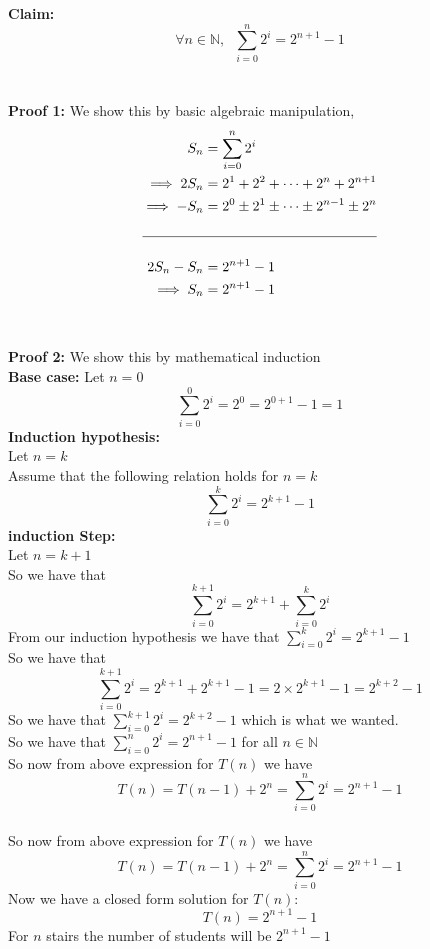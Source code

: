 \documentclass[addpoints]{exam}
\begin{document}
\begin{questions}
\begin{solution}
		\textbf{Claim:} \[\forall n \in \mathbb{N}, \;\;\sum_{i=0}^n 2^i = 2^{n+1} - 1\]
		\\\\\textbf{Proof 1:} We show this by basic algebraic manipulation,
		\begin{equation*}
			\begin{aligned}
				S_n            & = \sum_{i=0}^n 2^i                           \\
				\implies 2S_n  & = 2^1 + 2^2 + \cdots + 2^n + 2^{n+1}         \\
				\implies - S_n & = 2^0 \pm 2^1 \pm \cdots \pm 2^{n-1} \pm 2^n \\\\\hline\\
				2S_n - S_n     & = 2^{n+1} - 1                                \\
				\implies S_n   & = 2^{n+1} - 1
			\end{aligned}
		\end{equation*}
		\\\\\textbf{Proof 2:} We show this by mathematical induction
		\\\textbf{Base case:} Let $n = 0$
		$$\sum_{i=0}^0 2^i = 2^0 = 2^{0+1} - 1 = 1$$
		\textbf{Induction hypothesis:}
		\\Let $n = k$
		\\Assume that the following relation holds for $n = k$
		$$\sum_{i=0}^k 2^i = 2^{k+1} - 1$$
		\textbf{induction Step:}
		\\Let $n = k+1$
		\\So we have that
		$$\sum_{i=0}^{k+1} 2^i = 2^{k+1} + \sum_{i=0}^{k} 2^i $$
		From our induction hypothesis we have that $\sum_{i=0}^k 2^i = 2^{k+1} - 1$
		\\So we have that
		$$\sum_{i=0}^{k+1} 2^i = 2^{k+1} + 2^{k+1} - 1 = 2\times 2^{k+1} - 1 = 2^{k+2} - 1$$
		So we have that $\sum_{i=0}^{k+1} 2^i = 2^{k+2} - 1$ which is what we wanted.
		\\So we have that $\sum_{i=0}^n 2^i = 2^{n+1} - 1$ for all $n \in \mathbb{N}$
		\\So now from above expression for $T(n)$ we have
		$$T(n) = T(n-1) + 2^n = \sum_{i=0}^n 2^i = 2^{n+1} - 1$$
		\\So now from above expression for $T(n)$ we have
		$$T(n) = T(n-1) + 2^n = \sum_{i=0}^n 2^i = 2^{n+1} - 1$$
		Now we have a closed form solution for $T(n)$:
		$$T(n) = 2^{n+1} - 1$$
		For $n$ stairs the number of students will be $2^{n+1} - 1$
	\end{solution}


\end{questions}
\end{document}
